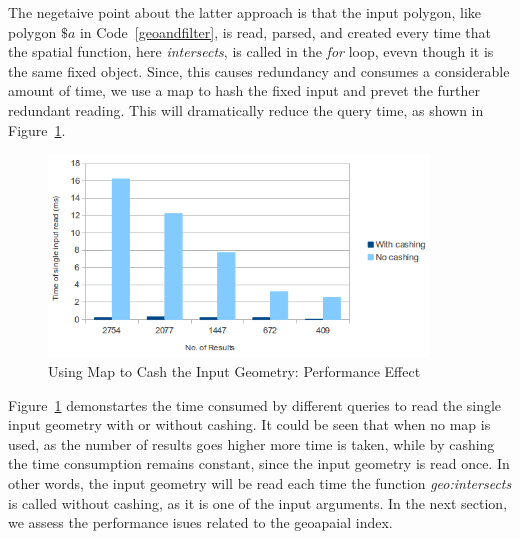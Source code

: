 \documentclass[a4paper,12pt]{article}
\begin{document}
The negetaive point about the latter approach is that the input polygon, like polygon $\$a$ in Code~\ref{geoandfilter}, is read, parsed, and created every time that the spatial function, here \textit{intersects}, is called in the \textit{for} loop, evevn though it is the same fixed object. Since, this causes redundancy and consumes a considerable amount of time, we use a map to hash the fixed input and prevet the further redundant reading. This will dramatically reduce the query time, as shown in Figure~\ref{figMap}.
 \begin{figure}
\centering
\includegraphics[width=0.9\textwidth]{MapIndexing}
\caption{Using Map to Cash the Input Geometry: Performance Effect}
\label{figMap}
\end{figure}

Figure~\ref{figMap} demonstartes the time consumed by different queries to read the single input geometry with or without cashing. It could be seen that when no map is used, as the number of results goes higher more time is taken, while by cashing the time consumption remains constant, since the input geometry is read once. In other words, the input geometry will be read each time the function \textit{geo:intersects} is called without cashing, as it is one of the input arguments. In the next section, we assess the performance isues related to the geoapaial index.
\end{document}
